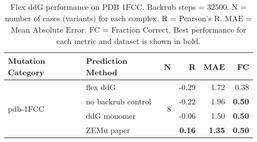 \begin{table}
  \begin{tabular}{llrrrr}
\toprule
Mutation Category &   Prediction Method &  N &     R &  MAE &   FC \\
\midrule
 \multirow{ 4}{*}{pdb-1FCC} & flex ddG & \multirow{ 4}{*}{8} & -0.29 & 1.72 & 0.38  \\
 & no backrub control & & -0.22 & 1.96 & \textbf{0.50}  \\
 & ddG monomer & & -0.06 & 1.50 & \textbf{0.50}  \\
 & ZEMu paper & & \textbf{0.16} & \textbf{1.35} & \textbf{0.50}  \\
\bottomrule
\end{tabular}
  \caption[Flex ddG performance on PDB 1FCC]{
    Flex ddG performance on PDB 1FCC. Backrub steps = 32500. N = number of cases (variants) for each complex. R = Pearson's R. MAE = Mean Absolute Error. FC = Fraction Correct. Best performance for each metric and dataset is shown in bold.
  } \label{tab:table-pdb-1FCC}
\end{table}
